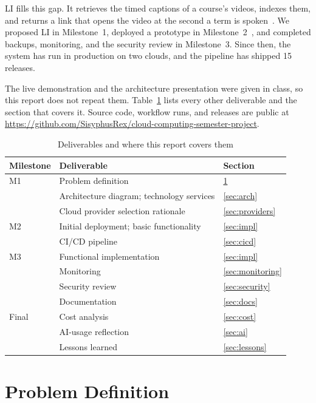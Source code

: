 \documentclass[conference]{IEEEtran}
\newcommand{\repo}{https://github.com/SisyphusRex/cloud-computing-semester-project}
\begin{document}
LI fills this gap. It retrieves the timed captions of a course's videos,
indexes them, and returns a link that opens the video at the second a term
is spoken~\cite{m1}. We proposed LI in Milestone~1, deployed a prototype in
Milestone~2~\cite{m2}, and completed backups, monitoring, and the security
review in Milestone~3. Since then, the system has run in production on two
clouds, and the pipeline has shipped 15 releases.

The live demonstration and the architecture presentation were given in
class, so this report does not repeat them. Table~\ref{tab:summary} lists
every other deliverable and the section that covers it. Source code,
workflow runs, and releases are public at \url{\repo}.

\begin{table}[!t]
\caption{Deliverables and where this report covers them}
\label{tab:summary}
\centering\small
\begin{tabularx}{\columnwidth}{@{}lXl@{}}
\toprule
Milestone & Deliverable & Section \\
\midrule
M1 & Problem definition & \ref{sec:problem} \\
   & Architecture diagram; technology services & \ref{sec:arch} \\
   & Cloud provider selection rationale & \ref{sec:providers} \\
M2 & Initial deployment; basic functionality & \ref{sec:impl} \\
   & CI/CD pipeline & \ref{sec:cicd} \\
M3 & Functional implementation & \ref{sec:impl} \\
   & Monitoring & \ref{sec:monitoring} \\
   & Security review & \ref{sec:security} \\
   & Documentation & \ref{sec:docs} \\
Final & Cost analysis & \ref{sec:cost} \\
   & AI-usage reflection & \ref{sec:ai} \\
   & Lessons learned & \ref{sec:lessons} \\
\bottomrule
\end{tabularx}
\end{table}

\section{Problem Definition}
\label{sec:problem}
\end{document}
